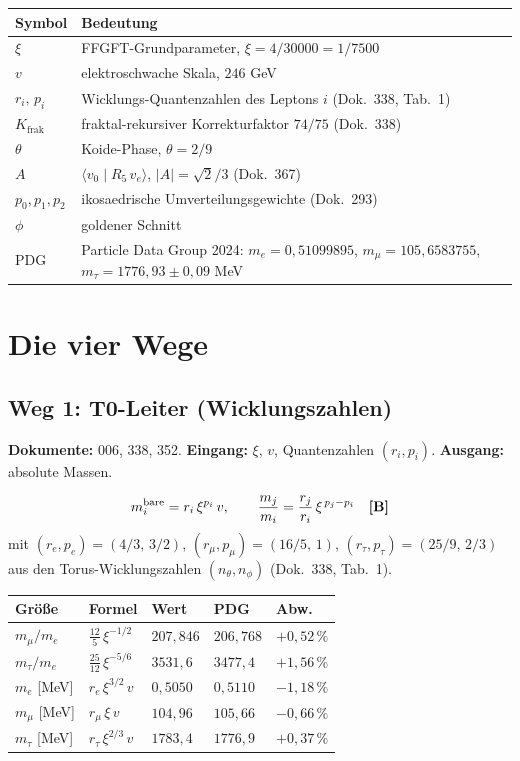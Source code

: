 \medskip
\begin{tabular}{@{}lp{11cm}@{}}
\toprule
\textbf{Symbol} & \textbf{Bedeutung} \\
\midrule
$\xi$ & FFGFT-Grundparameter, $\xi = 4/30000 = 1/7500$ \\
$v$ & elektroschwache Skala, $246$ GeV \\
$r_i,\,p_i$ & Wicklungs-Quantenzahlen des Leptons $i$ (Dok.~338, Tab.~1) \\
$K_\text{frak}$ & fraktal-rekursiver Korrekturfaktor $74/75$ (Dok.~338) \\
$\theta$ & Koide-Phase, $\theta = 2/9$ \\
$A$ & $\langle v_0\mid R_5\,v_e\rangle$, $|A| = \sqrt2/3$ (Dok.~367) \\
$p_0,p_1,p_2$ & ikosaedrische Umverteilungsgewichte (Dok.~293) \\
$\phi$ & goldener Schnitt \\
PDG & Particle Data Group 2024: $m_e = 0{,}51099895$, $m_\mu = 105{,}6583755$, $m_\tau = 1776{,}93\pm0{,}09$ MeV \\
\bottomrule
\end{tabular}

\section{Die vier Wege}

\subsection{Weg 1: T0-Leiter (Wicklungszahlen)}

\textbf{Dokumente:} 006, 338, 352. \quad
\textbf{Eingang:} $\xi$, $v$, Quantenzahlen $(r_i, p_i)$. \quad
\textbf{Ausgang:} absolute Massen.

\[
  m_i^\text{bare} = r_i\,\xi^{p_i}\,v, \qquad
  \frac{m_j}{m_i} = \frac{r_j}{r_i}\,\xi^{\,p_j - p_i} \quad \textbf{[B]}
\]
mit $(r_e,p_e) = (4/3,\,3/2)$, $(r_\mu,p_\mu) = (16/5,\,1)$, $(r_\tau,p_\tau) = (25/9,\,2/3)$
aus den Torus-Wicklungszahlen $(n_\theta, n_\phi)$ (Dok.~338, Tab.~1).

\begin{center}
\begin{tabular}{@{}lllll@{}}
\toprule
Größe & Formel & Wert & PDG & Abw. \\
\midrule
$m_\mu/m_e$  & $\tfrac{12}{5}\,\xi^{-1/2}$  & $207{,}846$ & $206{,}768$ & $+0{,}52\,\%$ \\
$m_\tau/m_e$ & $\tfrac{25}{12}\,\xi^{-5/6}$ & $3531{,}6$  & $3477{,}4$  & $+1{,}56\,\%$ \\
$m_e$ [MeV]  & $r_e\,\xi^{3/2}\,v$ & $0{,}5050$ & $0{,}5110$ & $-1{,}18\,\%$ \\
$m_\mu$ [MeV]& $r_\mu\,\xi\,v$     & $104{,}96$ & $105{,}66$ & $-0{,}66\,\%$ \\
$m_\tau$ [MeV]& $r_\tau\,\xi^{2/3}\,v$ & $1783{,}4$ & $1776{,}9$ & $+0{,}37\,\%$ \\
\bottomrule
\end{tabular}
\end{center}

